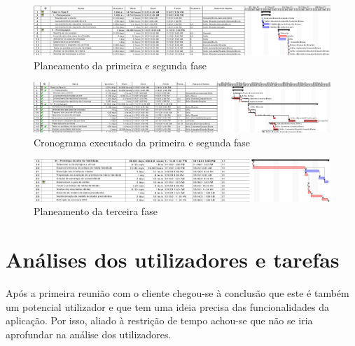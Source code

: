 \documentclass[11pt, twoside]{report}
\begin{document}
	\clearpage
	\begin{landscape}
		\pagestyle{empty}
		
		\begin{figure}[H] 
			\centering 			\includegraphics[width=1.4\textwidth,height=1.4\textheight,keepaspectratio]{image/planeamento_1fase}
			\caption{Planeamento da primeira e segunda fase}
			
		\end{figure}
	
	\begin{figure}[H] 
		\centering 			\includegraphics[width=1.4\textwidth,height=1.4\textheight,keepaspectratio]{image/cronogramaexecutado}
		\caption{Cronograma executado da primeira e segunda fase}
		\label{cronogramaexecutado}
	\end{figure}

	\begin{figure}[H] 
		\centering 			\includegraphics[width=1.4\textwidth,height=1.4\textheight,keepaspectratio]{image/Planeamentodaterceirafase}
		\caption{Planeamento da terceira fase}
		\label{planeamentoTerceiraFase}
	\end{figure}

	\end{landscape}


	
	
	\chapter{Análises dos utilizadores e tarefas}
	\label{analiseutilizador}
	
	Após a primeira reunião com o cliente chegou-se à conclusão que  este é também um potencial utilizador e que tem uma ideia precisa das funcionalidades da aplicação. Por isso, aliado à restrição de tempo achou-se que não se iria aprofundar na análise dos utilizadores. 
	
\end{document}

